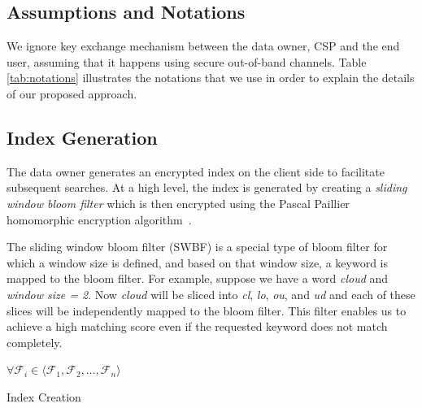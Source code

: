 \subsection{Assumptions and Notations}

We ignore key exchange mechanism between the data owner, CSP and the end user, assuming
that it happens using secure out-of-band channels.
Table \ref{tab:notations} illustrates the notations that we use in order to explain
the details of our proposed approach.


\subsection{Index Generation}

The data owner generates an encrypted index on the client side to facilitate
subsequent searches. At a high level, the index is generated by creating a 
\textit{sliding window bloom filter} which is then encrypted using the Pascal Paillier
homomorphic encryption algorithm~\cite{pascal}. 

The sliding window bloom filter (SWBF) is a special type of bloom filter
for which a window size is defined, and based on that
window size, a keyword is mapped to the bloom filter. For example, suppose we have a word
\emph{cloud} and \emph {window size = 2}. Now \emph{cloud} will be sliced into
\emph{cl}, \emph{lo}, \emph{ou}, and \emph{ud} and each of these slices will be 
independently mapped to the bloom filter. This filter enables us to achieve
 a high matching score even if the requested keyword does not match completely.

\begin{algorithm}
$ \forall \mathcal{F}_i \in \langle \mathcal{F}_1, \mathcal{F}_2, \ldots,
\mathcal{F}_n \rangle$\;
\;
 \caption{Index Creation}
 \label{algo:IndexCreation}
\end{algorithm}

